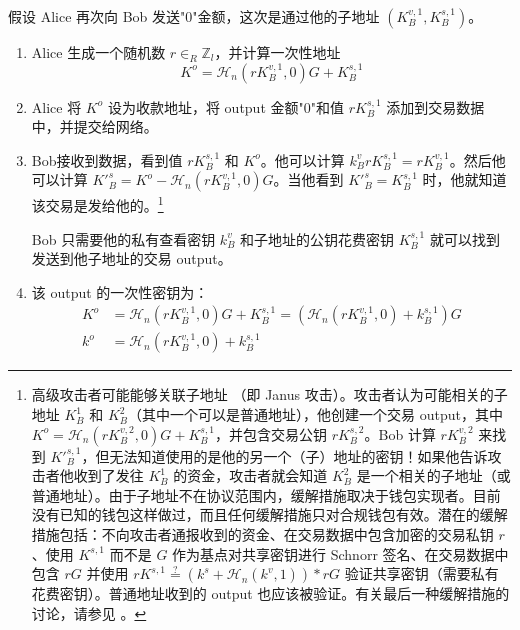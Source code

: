 假设 Alice 再次向 Bob 发送"0"金额，这次是通过他的子地址 $(K_B^{v,1}, K_B^{s,1})$。
\begin{enumerate}
	\item Alice 生成一个随机数 $r \in_R \mathbb{Z}_l$，并计算一次性地址\vspace{.175cm}
	\[ K^o  = \mathcal{H}_n(r K_B^{v,1},0)G + K_B^{s,1} \]

	\item Alice 将 $K^o$ 设为收款地址，将 output 金额"0"和值 $r K_B^{s,1}$ 添加到交易数据中，并提交给网络。
	
	\item Bob接收到数据，看到值 $r K_B^{s,1}$ 和 $K^o$。他可以计算 $k_B^v r K_B^{s,1} = r K_B^{v,1}$。然后他可以计算 $K'^{s}_B = K^o - \mathcal{H}_n(r K_B^{v,1},0)G$。当他看到 $K'^{s}_B = K^{s,1}_B$ 时，他就知道该交易是发给他的。\footnote{高级攻击者可能能够关联子地址 \cite{janus-attack}（即 Janus 攻击）。攻击者认为可能相关的子地址 $K_B^1$ $和$ $K_B^2$（其中一个可以是普通地址），他创建一个交易 output，其中 $K^o = \mathcal{H}_n(r K_B^{v,2},0)G + K_B^{s,1}$，并包含交易公钥 $r K_B^{s,2}$。Bob 计算 $r K_B^{v,2}$ 来找到 $K'^{s,1}_B$，但无法知道使用的是他的{另一个}（子）地址的密钥！如果他告诉攻击者他收到了发往 $K_B^1$ 的资金，攻击者就会知道 $K_B^2$ 是一个相关的子地址（或普通地址）。由于子地址不在协议范围内，缓解措施取决于钱包实现者。目前没有已知的钱包这样做过，而且任何缓解措施只对合规钱包有效。潜在的缓解措施包括：不向攻击者通报收到的资金、在交易数据中包含加密的交易私钥 $r$、使用 $K^{s,1}$ 而不是 $G$ 作为基点对共享密钥进行 Schnorr 签名、在交易数据中包含 $rG$ 并使用 $rK^{s,1} \stackrel{?}{=} (k^s + \mathcal{H}_n(k^v, 1))*rG$ 验证共享密钥（需要私有花费密钥）。普通地址收到的 output 也应该被验证。有关最后一种缓解措施的讨论，请参见 \cite{janus-mitigation-issue-62}。}
	
	Bob 只需要他的私有查看密钥 $k_B^v$ 和子地址的公钥花费密钥 $K^{s,1}_B$ 就可以找到发送到他子地址的交易 output。
	
	\item 该 output 的一次性密钥为：\vspace{.175cm}
	\begin{align*}
		K^o &= \mathcal{H}_n(r K_B^{v,1},0)G + K_B^{s,1} = (\mathcal{H}_n(r K_B^{v,1},0) + k_B^{s,1})G  \\ 
		k^o &= \mathcal{H}_n(r K_B^{v,1},0) + k_B^{s,1}
	\end{align*}
\end{enumerate}

